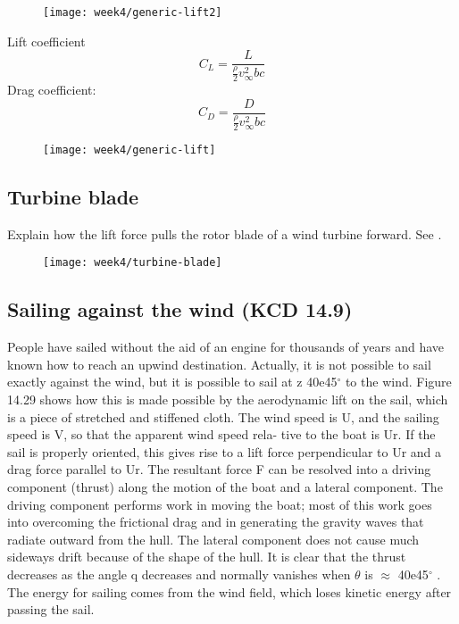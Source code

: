 \begin{figure}[!h]
    \centering
    \texttt{[image: week4/generic-lift2]}\\
    \caption{}
    \label{fig:generic-lift2}
\end{figure}

Lift coefficient
\begin{equation}
C_L = \frac{L}{\frac{\rho}{2}v_\infty^2 b c}
\end{equation}
Drag coefficient:
\begin{equation}
C_D = \frac{D}{\frac{\rho}{2}v_\infty^2 b c}
\end{equation}

\begin{figure}[!h]
    \centering
    \texttt{[image: week4/generic-lift]}\\
    \caption{}
    \label{fig:generic-lift}
\end{figure}


\subsection{Turbine blade}
Explain how the lift force pulls the rotor blade of a wind turbine forward. See .
\begin{figure}[!h]
    \centering
    \texttt{[image: week4/turbine-blade]}\\
    \caption{}
    \label{fig:turbine-blade}
\end{figure}


\subsection[Sailing against the wind]{Sailing against the wind (KCD 14.9)}
People have sailed without the aid of an engine for thousands of years and have known
how to reach an upwind destination. Actually, it is not possible to sail exactly against the
wind, but it is possible to sail at z 40e45$^\circ$ to the wind. Figure 14.29 shows how this is
made possible by the aerodynamic lift on the sail, which is a piece of stretched and stiffened
cloth. The wind speed is U, and the sailing speed is V, so that the apparent wind speed rela-
tive to the boat is Ur. If the sail is properly oriented, this gives rise to a lift force perpendicular
to Ur and a drag force parallel to Ur. The resultant force F can be resolved into a driving
component (thrust) along the motion of the boat and a lateral component. The driving
component performs work in moving the boat; most of this work goes into overcoming
the frictional drag and in generating the gravity waves that radiate outward from the hull.
The lateral component does not cause much sideways drift because of the shape of the
hull. It is clear that the thrust decreases as the angle q decreases and normally vanishes
when $\theta$ is $\approx$ 40e45$^\circ$ . The energy for sailing comes from the wind field, which loses kinetic
energy after passing the sail.

